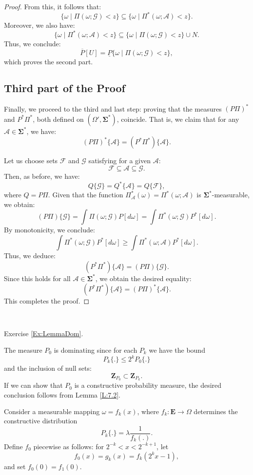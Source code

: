 \begin{proof}
From this, it follows that:
\[
\{ \omega \mid \Pi(\omega; \mathcal{G}) < z \} \subseteq \{ \omega \mid \Pi^* (\omega; \mathcal{A}) < z \}.
\]
Moreover, we also have:
\[
\{ \omega \mid \Pi^*(\omega; \mathcal{A}) < z \} \subseteq \{ \omega \mid \Pi(\omega; \mathcal{G}) < z \} \cup N.
\]
Thus, we conclude:
\[
\overline{P} [ U ] = \underline{P} \{ \omega \mid \Pi(\omega; \mathcal{G}) < z \},
\]
which proves the second part.

\subsection*{Third part of the Proof}

Finally, we proceed to the third and last step: proving that the measures $(P\Pi)^*$ and $P^*\Pi^*$, both defined on $(\Omega',\mathbf{\Sigma^*})$, coincide. That is, we claim that for any $\mathcal{A} \in \mathbf{\Sigma^*}$, we have:
\[
(P \Pi)^* \{\mathcal{A}\} = (P^* \Pi^*)\{\mathcal{A}\}.
\]

Let us choose sets $\mathcal{F}$ and $\mathcal{G}$ satisfying for a given  $\mathcal{A}$:
\[
\mathcal{F}  \subseteq \mathcal{A} \subseteq \mathcal{G}.
\]
Then, as before, we have:
\[
Q\{\mathcal{G} \} = Q^*\{ \mathcal{A}\} = Q\{ \mathcal{F} \},
\]
where $Q = P \Pi$. Given that the function $\Pi_{\mathcal{A}}^*(\omega) = \Pi^*(\omega; \mathcal{A})$ is $\mathbf{\Sigma^*}$-measurable, we obtain:
\[
(P\Pi)\{ \mathcal{G} \} = \int \Pi(\omega; \mathcal{G}) P[d\omega] =
\int \Pi^*(\omega; \mathcal{G}) P^*[d\omega].
\]
By monotonicity, we conclude:
\[
\int \Pi^*(\omega; \mathcal{G}) P^*[d\omega] \geq \int \Pi^*(\omega; \mathcal{A})P^*[d\omega].
\]
Thus, we deduce:
\[
(P^* \Pi^*)\{ \mathcal{A} \} = (P\Pi)\{\mathcal{G}\}.
\]
Since this holds for all $\mathcal{A} \in \mathbf{\Sigma^*}$, we obtain the desired equality:
\[
(P^* \Pi^*)\{\mathcal{A} \} = (P \Pi)^* \{ \mathcal{A}\}.
\]
This completes the proof.

\end{proof}
\, 

Exercise \ref{Ex:LemmaDom}.

    The measure $P_0$ is dominating since for each $P_k$ we have the bound 
    \[
    P_k\{.\} \leq 2^k P_0\{.\}
    \]
    and the inclusion of null sets:
    \[
    \mathbf{Z}_{P_0} \subset \mathbf{Z}_{P_k}.
    \]
    If we can show that $P_0$ is a constructive probability measure, the desired conclusion follows from Lemma \ref{L:7.2}. 

    Consider a measurable mapping $\omega = f_k(x)$, where $f_k : \mathbf{E} \to \Omega$ determines the constructive distribution 
    \[
    P_k\{.\} = \lambda \frac{1}{f_k(.)}.
    \]
    Define $f_0$ piecewise as follows: for $2^{-k} < x < 2^{-k+1}$, let
    \[
    f_0(x) = g_k(x) = f_k (2^k x -1),
    \]
    and set $f_0(0) = f_1(0)$. 

